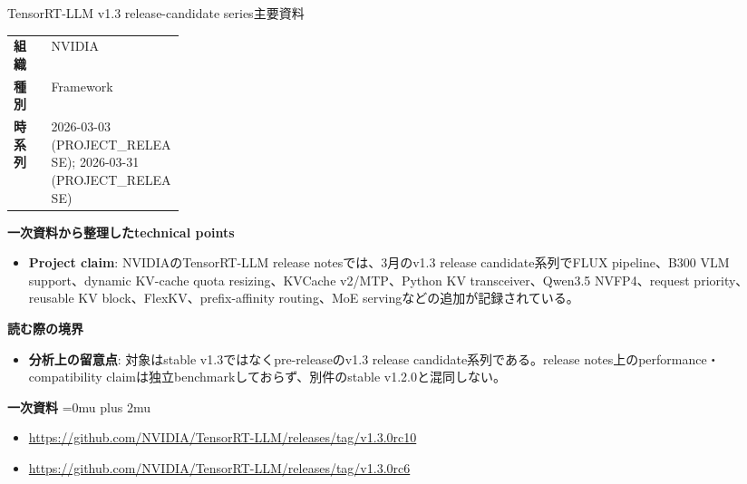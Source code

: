 \begin{technicalnote}{TensorRT-LLM v1.3 release-candidate series}{主要資料}
\begingroup
\begin{tabularx}{\linewidth}{@{}>{\bfseries}p{0.22\linewidth}X@{}}
組織 & NVIDIA \\
種別 & Framework \\
時系列 & 2026-03-03 (PROJECT\_RELEASE); 2026-03-31 (PROJECT\_RELEASE) \\
\end{tabularx}
\smallskip
{\bfseries 一次資料から整理したtechnical points}
\begin{itemize}[leftmargin=1.5em,itemsep=0.35em]
\item \textbf{Project claim}: NVIDIAのTensorRT-LLM release notesでは、3月のv1.3 release candidate系列でFLUX pipeline、B300 VLM support、dynamic KV-cache quota resizing、KVCache v2/MTP、Python KV transceiver、Qwen3.5 NVFP4、request priority、reusable KV block、FlexKV、prefix-affinity routing、MoE servingなどの追加が記録されている。
\end{itemize}
\begin{minipage}{\linewidth}
{\bfseries 読む際の境界}
\begin{itemize}[leftmargin=1.5em,itemsep=0.35em]
\item \textbf{分析上の留意点}: 対象はstable v1.3ではなくpre-releaseのv1.3 release candidate系列である。release notes上のperformance・compatibility claimは独立benchmarkしておらず、別件のstable v1.2.0と混同しない。
\end{itemize}
\begin{samepage}
{\bfseries 一次資料}
\begingroup\sloppy
\Urlmuskip=0mu plus 2mu\relax
\begin{itemize}[leftmargin=1.5em,itemsep=0.25em]
\item {\scriptsize\url{https://github.com/NVIDIA/TensorRT-LLM/releases/tag/v1.3.0rc10}}
\item {\scriptsize\url{https://github.com/NVIDIA/TensorRT-LLM/releases/tag/v1.3.0rc6}}
\end{itemize}
\endgroup
\end{samepage}
\end{minipage}
\endgroup
\end{technicalnote}
\medskip

